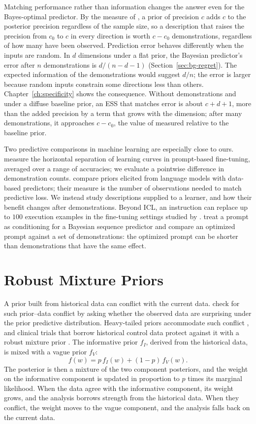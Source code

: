 Matching performance rather than information changes the answer even for the Bayes-optimal predictor. By the measure of \citet{morita2008}, a prior of precision $c$ adds $c$ to the posterior precision regardless of the sample size, so a description that raises the precision from $c_0$ to $c$ in every direction is worth $c - c_0$ demonstrations, regardless of how many have been observed. Prediction error behaves differently when the inputs are random. In $d$ dimensions under a flat prior, the Bayesian predictor's error after $n$ demonstrations is $d/(n - d - 1)$ (Section~\ref{sec:bg-regret}). The expected information of the demonstrations would suggest $d/n$; the error is larger because random inputs constrain some directions less than others. Chapter~\ref{ch:specificity} shows the consequence. Without demonstrations and under a diffuse baseline prior, an ESS that matches error is about $c+d+1$, more than the added precision by a term that grows with the dimension; after many demonstrations, it approaches $c - c_0$, the value of \citet{morita2008} measured relative to the baseline prior.

Two predictive comparisons in machine learning are especially close to ours. \citet{lescao2021} measure the horizontal separation of learning curves in prompt-based fine-tuning, averaged over a range of accuracies; we evaluate a pointwise difference in demonstration counts. \citet{selby2025} compare priors elicited from language models with data-based predictors; their measure is the number of observations needed to match predictive loss. We instead study descriptions supplied to a learner, and how their benefit changes after demonstrations. Beyond ICL, an instruction can replace up to $100$ execution examples in the fine-tuning settings studied by \citet{cook2026}. \citet{wenliang2026} treat a prompt as conditioning for a Bayesian sequence predictor and compare an optimized prompt against a set of demonstrations: the optimized prompt can be shorter than demonstrations that have the same effect.

\section{Robust Mixture Priors}\label{sec:bg-mixture}
A prior built from historical data can conflict with the current data. \citet{evans2006} check for such prior--data conflict by asking whether the observed data are surprising under the prior predictive distribution. Heavy-tailed priors accommodate such conflict \citep{ohagan2012}, and clinical trials that borrow historical control data protect against it with a robust mixture prior \citep{schmidli2014}. The informative prior $f_I$, derived from the historical data, is mixed with a vague prior $f_V$:
\[
    f(w) = p\, f_I(w) + (1 - p)\, f_V(w).
\]
The posterior is then a mixture of the two component posteriors, and the weight on the informative component is updated in proportion to $p$ times its marginal likelihood. When the data agree with the informative component, its weight grows, and the analysis borrows strength from the historical data. When they conflict, the weight moves to the vague component, and the analysis falls back on the current data.

